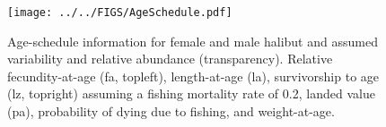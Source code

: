 \begin{figure}[htbp]
	\centering
		\texttt{[image: ../../FIGS/AgeSchedule.pdf]}
	\caption{Age-schedule information for female and male halibut and assumed variability and relative abundance (transparency). Relative fecundity-at-age (fa, topleft), length-at-age (la), survivorship to age (lz, topright) assuming a fishing mortality rate of 0.2, landed value (pa), probability of dying due to fishing, and weight-at-age.}
	\label{fig:FIGS_AgeSchedule}
\end{figure}



